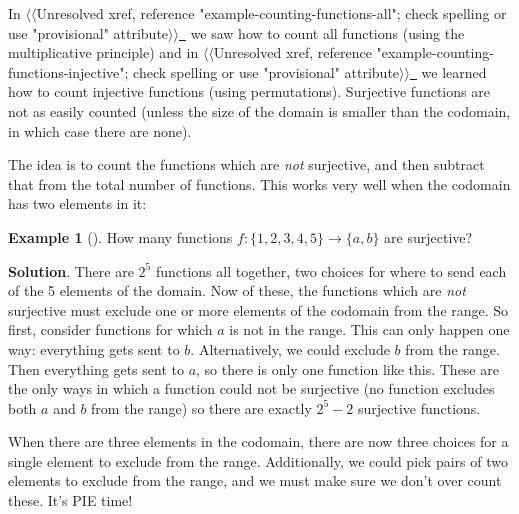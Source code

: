 \documentclass[10pt,]{book}
\theoremstyle{plain}
\theoremstyle{definition}
\theoremstyle{definition}
\newtheorem{example}[theorem]{Example}
\theoremstyle{definition}
\theoremstyle{definition}
\numberwithin{equation}{chapter}
\begin{document}
\hypertarget{p-995}{}%
In {$\langle\langle$Unresolved xref, reference "example-counting-functions-all"; check spelling or use "provisional" attribute$\rangle\rangle$}\hyperlink{}{~} we saw how to count all functions (using the multiplicative principle) and in {$\langle\langle$Unresolved xref, reference "example-counting-functions-injective"; check spelling or use "provisional" attribute$\rangle\rangle$}\hyperlink{}{~} we learned how to count injective functions (using permutations).  Surjective functions are not as easily counted (unless the size of the domain is smaller than the codomain, in which case there are none).%
\par
\hypertarget{p-996}{}%
The idea is to count the functions which are \emph{not} surjective, and then subtract that from the total number of functions. This works very well when the codomain has two elements in it:%
\begin{example}[]\label{example-17}
\hypertarget{p-997}{}%
How many functions \(f: \{1,2,3,4,5\} \to \{a,b\}\) are surjective?%
\par\smallskip%
\noindent\textbf{Solution}.\hypertarget{solution-84}{}\quad%
\hypertarget{p-998}{}%
There are \(2^5\) functions all together, two choices for where to send each of the 5 elements of the domain. Now of these, the functions which are \emph{not} surjective must exclude one or more elements of the codomain from the range. So first, consider functions for which \(a\) is not in the range. This can only happen one way: everything gets sent to \(b\). Alternatively, we could exclude \(b\) from the range. Then everything gets sent to \(a\), so there is only one function like this. These are the only ways in which a function could not be surjective (no function excludes both \(a\) and \(b\) from the range) so there are exactly \(2^5 - 2\) surjective functions.%
\end{example}
\hypertarget{p-999}{}%
When there are three elements in the codomain, there are now three choices for a single element to exclude from the range. Additionally, we could pick pairs of two elements to exclude from the range, and we must make sure we don't over count these. It's PIE time!%
\end{document}
